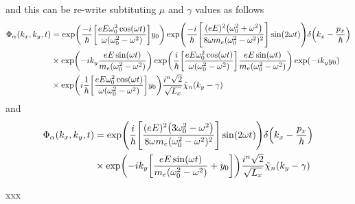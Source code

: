 and this can be re-write subtituting $\mu$ and $\gamma$ values as follows
\begin{equation} \label{3.35}
  \begin{aligned}
    \Phi_{\alpha}(k_x,k_y,t) & =
    \exp(
      \frac{-i}{\hbar}
      \qty[
      \frac{eE\omega_0^2\cos(\omega t)}{\omega(\omega_0^2 - \omega^2)}]y_0
    )
    \exp(
      \frac{-i}{\hbar}
      \qty[
      \frac{(eE)^2\qty(\omega_0^2 + \omega^2)}{8\omega m_e(\omega_0^2 - \omega^2)^2}
      ]\sin(2\omega t)
    )
    \delta\qty(k_x -\frac{p_x}{\hbar})\\
    & \times
    \exp(
      -ik_y  \frac{eE\sin(\omega t)}{m_e(\omega_0^2 - \omega^2)}
    )
    \exp(
      \frac{i}{\hbar}
      \qty[ \frac{eE\omega_0^2\cos(\omega t)}{\omega(\omega_0^2 - \omega^2)}]
      \frac{eE\sin(\omega t)}{m_e(\omega_0^2 - \omega^2)}
    )
    \exp(
      -i k_y y_0
    ) \\
    & \times
    \exp(
      i \frac{1}{\hbar}
      \qty[ \frac{eE\omega_0^2\cos(\omega t)}{\omega(\omega_0^2 - \omega^2)}]
      y_0
    )
    \frac{i^n\sqrt{2}}{\sqrt{L_x}}
    \tilde{\chi}_{n}\qty(k_y -\gamma)
  \end{aligned}
\end{equation}
and
\begin{equation} \label{3.36}
  \begin{aligned}
    \Phi_{\alpha}(k_x,k_y,t) & =
    \exp(
      \frac{i}{\hbar}
      \qty[
      \frac{(eE)^2\qty(3\omega_0^2 - \omega^2)}{8\omega m_e(\omega_0^2 - \omega^2)^2}
      ]\sin(2\omega t)
    )
    \delta\qty(k_x -\frac{p_x}{\hbar})\\
    & \times
    \exp(
      -ik_y  \qty[\frac{eE\sin(\omega t)}{m_e(\omega_0^2 - \omega^2)} + y_0]
    )
    \frac{i^n\sqrt{2}}{\sqrt{L_x}}
    \tilde{\chi}_{n}\qty(k_y -\gamma)
  \end{aligned}
\end{equation}
















xxx
